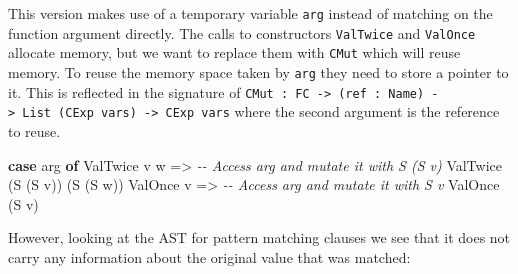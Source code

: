 \documentclass[
]{article}
\newenvironment{Shaded}{}{}
\newcommand{\CommentTok}[1]{\textcolor[rgb]{0.38,0.63,0.69}{\textit{#1}}}
\newcommand{\DataTypeTok}[1]{\textcolor[rgb]{0.56,0.13,0.00}{#1}}
\newcommand{\KeywordTok}[1]{\textcolor[rgb]{0.00,0.44,0.13}{\textbf{#1}}}
\newcommand{\NormalTok}[1]{#1}
\newcommand{\OtherTok}[1]{\textcolor[rgb]{0.00,0.44,0.13}{#1}}
\begin{document}
This version makes use of a temporary variable \texttt{arg} instead of
matching on the function argument directly. The calls to constructors
\texttt{ValTwice} and \texttt{ValOnce} allocate memory, but we want to
replace them with \texttt{CMut} which will reuse memory. To reuse the
memory space taken by \texttt{arg} they need to store a pointer to it.
This is reflected in the signature of
\texttt{CMut\ :\ FC\ -\textgreater{}\ (ref\ :\ Name)\ -\textgreater{}\ List\ (CExp\ vars)\ -\textgreater{}\ CExp\ vars}
where the second argument is the reference to reuse.

\begin{Shaded}
\begin{Highlighting}[]
\KeywordTok{case}\NormalTok{ arg }\KeywordTok{of}
     \DataTypeTok{ValTwice}\NormalTok{ v w }\OtherTok{=\textgreater{}} \CommentTok{{-}{-} Access \textasciigrave{}arg\textasciigrave{} and mutate it with S (S v)}
                     \DataTypeTok{ValTwice}\NormalTok{ (}\DataTypeTok{S}\NormalTok{ (}\DataTypeTok{S}\NormalTok{ v)) (}\DataTypeTok{S}\NormalTok{ (}\DataTypeTok{S}\NormalTok{ w))}
     \DataTypeTok{ValOnce}\NormalTok{ v }\OtherTok{=\textgreater{}} \CommentTok{{-}{-} Access \textasciigrave{}arg\textasciigrave{} and mutate it with S v}
                  \DataTypeTok{ValOnce}\NormalTok{ (}\DataTypeTok{S}\NormalTok{ v)}
\end{Highlighting}
\end{Shaded}

However, looking at the AST for pattern matching clauses we see that it
does not carry any information about the original value that was
matched:
\end{document}
